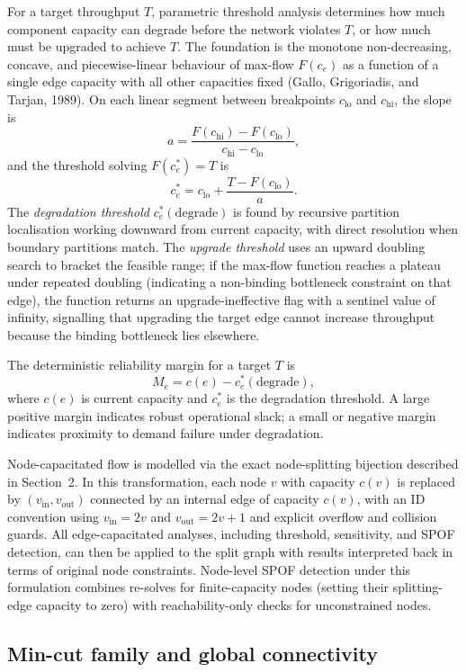 \documentclass[12pt]{report}
\begin{document}
For a target throughput $T$, parametric threshold analysis determines how much component capacity can degrade before the network violates $T$, or how much must be upgraded to achieve $T$. The foundation is the monotone non-decreasing, concave, and piecewise-linear behaviour of max-flow $F(c_e)$ as a function of a single edge capacity with all other capacities fixed (Gallo, Grigoriadis, and Tarjan, 1989). On each linear segment between breakpoints $c_{\mathrm{lo}}$ and $c_{\mathrm{hi}}$, the slope is
\[
a = \frac{F(c_{\mathrm{hi}}) - F(c_{\mathrm{lo}})}{c_{\mathrm{hi}} - c_{\mathrm{lo}}},
\]
and the threshold solving $F(c_e^*) = T$ is
\[
c_e^* = c_{\mathrm{lo}} + \frac{T - F(c_{\mathrm{lo}})}{a}.
\]
The \emph{degradation threshold} $c_e^*(\mathrm{degrade})$ is found by recursive partition localisation working downward from current capacity, with direct resolution when boundary partitions match. The \emph{upgrade threshold} uses an upward doubling search to bracket the feasible range; if the max-flow function reaches a plateau under repeated doubling (indicating a non-binding bottleneck constraint on that edge), the function returns an upgrade-ineffective flag with a sentinel value of infinity, signalling that upgrading the target edge cannot increase throughput because the binding bottleneck lies elsewhere.

The deterministic reliability margin for a target $T$ is
\[
M_e = c(e) - c_e^*(\mathrm{degrade}),
\]
where $c(e)$ is current capacity and $c_e^*$ is the degradation threshold. A large positive margin indicates robust operational slack; a small or negative margin indicates proximity to demand failure under degradation.

Node-capacitated flow is modelled via the exact node-splitting bijection described in Section~2. In this transformation, each node $v$ with capacity $c(v)$ is replaced by $(v_{\mathrm{in}}, v_{\mathrm{out}})$ connected by an internal edge of capacity $c(v)$, with an ID convention using $v_{\mathrm{in}} = 2v$ and $v_{\mathrm{out}} = 2v+1$ and explicit overflow and collision guards. All edge-capacitated analyses, including threshold, sensitivity, and SPOF detection, can then be applied to the split graph with results interpreted back in terms of original node constraints. Node-level SPOF detection under this formulation combines re-solves for finite-capacity nodes (setting their splitting-edge capacity to zero) with reachability-only checks for unconstrained nodes.

\subsection{Min-cut family and global connectivity}
\end{document}
